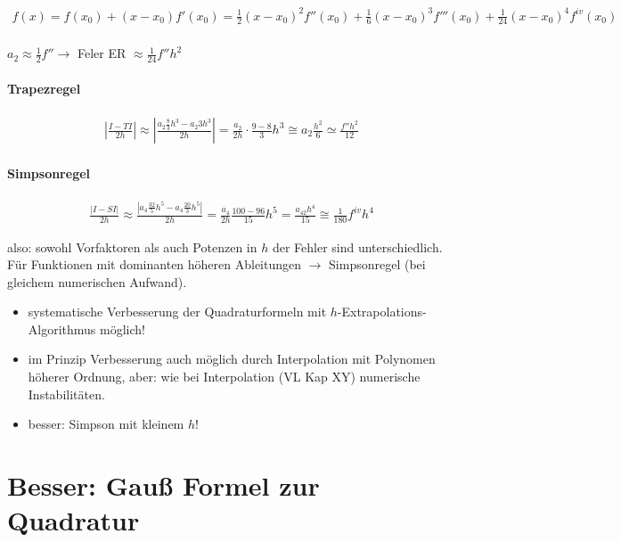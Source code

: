 \documentclass[a4paper,ngerman]{scrbook}
\begin{document}
\begin{align*}
  f(x) = f(x_0) + (x-x_0) f'(x_0) = \frac{1}{2}(x-x_0)^2 f''(x_0) + \frac{1}{6}(x-x_0)^3 f'''(x_0) + \frac{1}{24}(x-x_0)^4f^{iv}(x_0)\\
\end{align*}

$a_2 \approx \frac{1}{2} f'' \to$ Feler ER $\approx \frac{1}{24} f''h^2$

\paragraph{Trapezregel}

\begin{align*}
  \left|\frac{I-TI}{2h}\right| \approx \left| \frac{a_2\frac{8}{3}h^3 - a_2 3h^3}{2h} \right| = \frac{a_2}{2h} \cdot \frac{9-8}{3}h^3 \cong a_2\frac{h^2}{6} \simeq \frac{f''h^2}{12}
\end{align*}

\paragraph{Simpsonregel}

\begin{align*}
  \frac{ |I - SI|}{2h} \approx \frac{\left| a_4\frac{32}{5}h^5 - a_4\frac{20}{3}h^5\right|}{2h} = \frac{a_4}{2h} \frac{100-96}{15} h^5 = \frac{a_42h^4}{15} \cong \frac{1}{180} f^{iv} h^4
\end{align*}

also: sowohl Vorfaktoren als auch Potenzen in $h$ der Fehler sind unterschiedlich. Für Funktionen mit dominanten höheren Ableitungen $\to$ Simpsonregel (bei gleichem numerischen Aufwand).

\begin{itemize}
\item systematische Verbesserung der Quadraturformeln mit   $h$-Extrapolations-Algorithmus möglich!
\item im Prinzip Verbesserung auch möglich durch Interpolation mit Polynomen höherer Ordnung, aber: wie bei Interpolation (VL Kap XY) numerische Instabilitäten.
\item besser: Simpson mit kleinem $h$!
\end{itemize}

\section*{Besser: Gauß Formel zur Quadratur}
\end{document}
